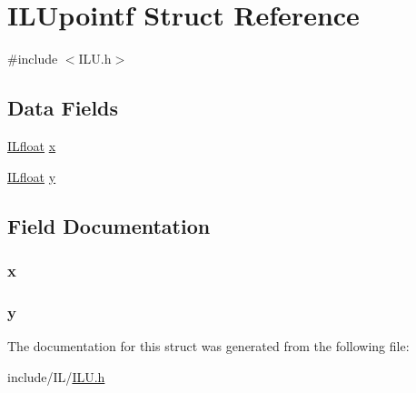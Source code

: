 \hypertarget{struct_i_l_upointf}{\section{I\+L\+Upointf Struct Reference}
\label{struct_i_l_upointf}
}


{\ttfamily \#include $<$I\+L\+U.\+h$>$}

\subsection*{Data Fields}
\begin{DoxyCompactItemize}
\item 
\hyperlink{group__il__types_ga376156c9461893f4b1a5de9579dc86f2}{I\+Lfloat} \hyperlink{struct_i_l_upointf_a6fe338394a16135b8e04a1dfbebe91c5}{x}
\item 
\hyperlink{group__il__types_ga376156c9461893f4b1a5de9579dc86f2}{I\+Lfloat} \hyperlink{struct_i_l_upointf_a015230e41bc2c902e8bba94b4501c689}{y}
\end{DoxyCompactItemize}


\subsection{Field Documentation}
\hypertarget{struct_i_l_upointf_a6fe338394a16135b8e04a1dfbebe91c5}{
\subsubsection[{x}]{ x}}\label{struct_i_l_upointf_a6fe338394a16135b8e04a1dfbebe91c5}
\hypertarget{struct_i_l_upointf_a015230e41bc2c902e8bba94b4501c689}{
\subsubsection[{y}]{ y}}\label{struct_i_l_upointf_a015230e41bc2c902e8bba94b4501c689}


The documentation for this struct was generated from the following file\+:\begin{DoxyCompactItemize}
\item 
include/\+I\+L/\hyperlink{_i_l_u_8h}{I\+L\+U.\+h}\end{DoxyCompactItemize}
